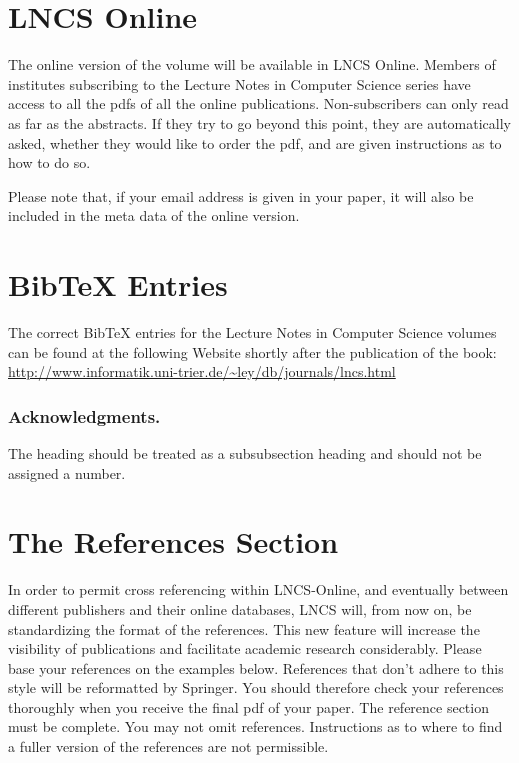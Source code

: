 \documentclass[runningheads]{llncs}
\begin{document}
{\section{LNCS Online}

The online version of the volume will be available in LNCS Online.
Members of institutes subscribing to the Lecture Notes in Computer
Science series have access to all the pdfs of all the online
publications. Non-subscribers can only read as far as the abstracts. If
they try to go beyond this point, they are automatically asked, whether
they would like to order the pdf, and are given instructions as to how
to do so.

Please note that, if your email address is given in your paper,
it will also be included in the meta data of the online version.

\section{BibTeX Entries}

The correct BibTeX entries for the Lecture Notes in Computer Science
volumes can be found at the following Website shortly after the
publication of the book:
\url{http://www.informatik.uni-trier.de/~ley/db/journals/lncs.html}

\subsubsection*{Acknowledgments.} The heading should be treated as a
subsubsection heading and should not be assigned a number.

\section{The References Section}\label{references}

In order to permit cross referencing within LNCS-Online, and eventually
between different publishers and their online databases, LNCS will,
from now on, be standardizing the format of the references. This new
feature will increase the visibility of publications and facilitate
academic research considerably. Please base your references on the
examples below. References that don't adhere to this style will be
reformatted by Springer. You should therefore check your references
thoroughly when you receive the final pdf of your paper.
The reference section must be complete. You may not omit references.
Instructions as to where to find a fuller version of the references are
not permissible.

}
\end{document}
